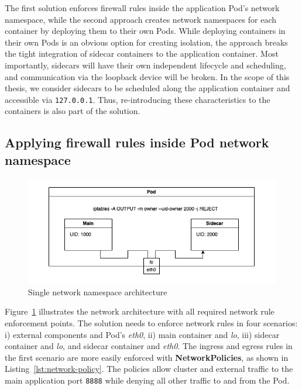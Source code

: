 \documentclass[english, 12pt, a4paper, sci, utf8, a-2b, online]{aaltothesis}
\begin{document}
The first solution enforces firewall rules inside the application Pod's network namespace, while the second approach creates network namespaces for each container by deploying them to their own Pods.
While deploying containers in their own Pods is an obvious option for creating isolation, the approach breaks the tight integration of sidecar containers to the application container.
Most importantly, sidecars will have their own independent lifecycle and scheduling, and communication via the loopback device will be broken.
In the scope of this thesis, we consider sidecars to be scheduled along the application container and accessible via \lstinline{127.0.0.1}.
Thus, re-introducing these characteristics to the containers is also part of the solution.

\subsection{Applying firewall rules inside Pod network namespace}

\begin{figure}[h!]
  \centering
  \includegraphics[width=\linewidth]{files/iptables.png}
  \caption{Single network namespace architecture}
  \label{fig:single-net-solution}
\end{figure}

Figure~\ref{fig:single-net-solution} illustrates the network architecture with all required network rule enforcement points.
The solution needs to enforce network rules in four scenarios: i) external components and Pod's \emph{eth0}, ii) main container and \emph{lo}, iii) sidecar container and \emph{lo}, and sidecar container and \emph{eth0}.
The ingress and egress rules in the first scenario are more easily enforced with \textbf{NetworkPolicies}, as shown in Listing~\ref{lst:network-policy}.
The policies allow cluster and external traffic to the main application port \lstinline{8888} while denying all other traffic to and from the Pod.
\end{document}
